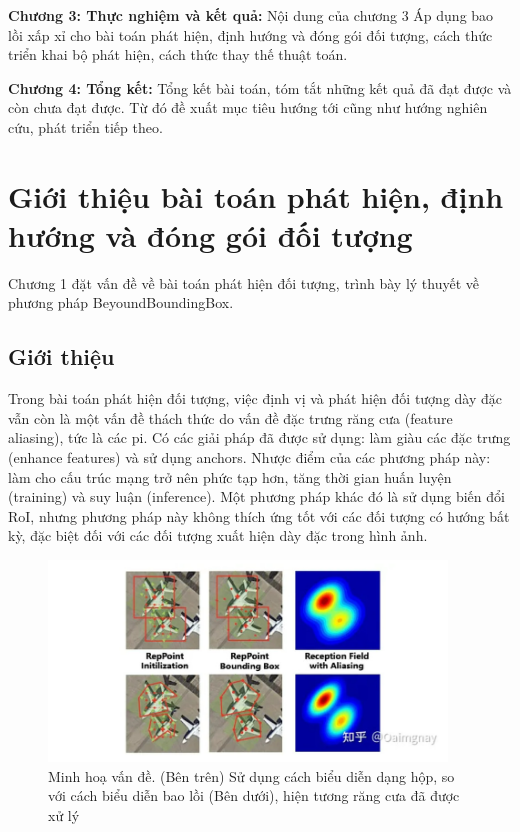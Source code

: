 \documentclass[12pt,a4paper,openany,oneside]{report}
\begin{document}
\textbf{Chương 3: Thực nghiệm và kết quả:}
Nội dung của chương 3 Áp dụng bao lồi xấp xỉ cho bài toán phát hiện, định hướng và đóng gói đối tượng, cách thức triển khai bộ phát hiện, cách thức thay thế thuật toán.


\textbf{Chương 4: Tổng kết:}
Tổng kết bài toán, tóm tắt những kết quả đã đạt được và còn chưa đạt được. Từ đó đề xuất mục tiêu hướng tới cũng như hướng nghiên cứu, phát triển tiếp theo.



 


\chapter{Giới thiệu bài toán phát hiện, định hướng và đóng gói đối tượng}

Chương 1 đặt vấn đề về bài toán phát hiện đối tượng, trình bày lý thuyết về phương pháp BeyoundBoundingBox.



\section{Giới thiệu}
Trong bài toán phát hiện đối tượng, việc định vị và phát hiện đối tượng dày đặc vẫn còn là một vấn đề thách thức do vấn đề đặc trưng răng cưa (feature aliasing), tức là các pi. Có các giải pháp đã được sử dụng: làm giàu các đặc trưng (enhance features) và sử dụng anchors. Nhược điểm của các phương pháp này: làm cho cấu trúc mạng trở nên phức tạp hơn, tăng thời gian huấn luyện (training) và suy luận (inference). Một phương pháp khác đó là sử dụng biến đổi RoI, nhưng phương pháp này không thích ứng tốt với các đối tượng có hướng bất kỳ, đặc biệt đối với các đối tượng xuất hiện dày đặc trong hình ảnh.


\begin{figure}[ht!]
	\begin{center}
		\includegraphics[width=400px]{./compare_cfa_with_other.JPG}
		\caption{Minh hoạ vấn đề. (Bên trên) Sử dụng cách biểu diễn dạng hộp, so với cách biểu diễn bao lồi (Bên dưới), hiện tương răng cưa đã được xử lý}
		\label{fig_dhandang1}
	\end{center}
\end{figure} 
\end{document}
